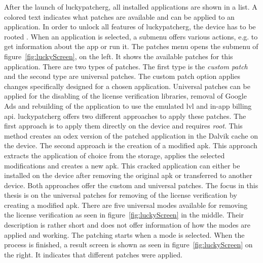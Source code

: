 After the launch of \gls{luckypatcherg}, all installed applications are shown in a list.
A colored text indicates what patches are available and can be applied to an application.
In order to unlock all features of \gls{luckypatcherg}, the device has to be rooted \cite{luckyPatcherOfficial}.
\newline
When an application is selected, a submenu offers various actions, e.g. to get information about the app or run it.
The patches menu opens the submenu of figure~\ref{fig:luckyScreen}, on the left.
It shows the available patches for this application.
\newline
There are two types of patches.
The first type is the \textit{custom patch} and the second type are universal patches.
The custom patch option applies changes specifically designed for a chosen application.
\newline
Universal patches can be applied for the disabling of the license verification libraries, removal of Google Ads and rebuilding of the application to use the emulated \gls{lvl} and in-app billing \gls{api}.
\newline
\gls{luckypatcherg} offers two different approaches to apply these patches.
The first approach is to apply them directly on the device and requires \textit{root}.
This method creates an \gls{odex} version of the patched application in the Dalvik cache on the device.
The second approach is the creation of a modified \gls{apk}.
This approach extracts the application of choice from the storage, applies the selected modifications and creates a new \gls{apk}.
This cracked application can either be installed on the device after removing the original \gls{apk} or transferred to another device.
\newline
Both approaches offer the custom and universal patches.
\newline
\newline
The focus in this thesis is on the universal patches for removing of the license verification by creating a modified \gls{apk}.
\newline
There are five universal modes available for removing the license verification as seen in figure~\ref{fig:luckyScreen} in the middle.
Their description is rather short and does not offer information of how the modes are applied and working.
\newline
The patching starts when a mode is selected.
When the process is finished, a result screen is shown as seen in figure~\ref{fig:luckyScreen} on the right.
It indicates that different patches were applied.
